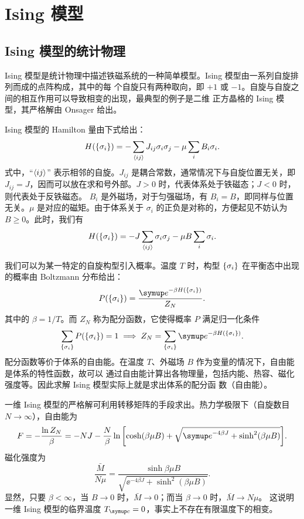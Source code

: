 \chapter{Ising 模型}

\section{Ising 模型的统计物理}
\label{sec:ising-physics}

Ising 模型是统计物理中描述铁磁系统的一种简单模型。Ising 模型由一系列自旋排列而成的点阵构成，其中的每
个自旋只有两种取向，即 $+1$ 或 $-1$。自旋与自旋之间的相互作用可以导致相变的出现，最典型的例子是二维
正方晶格的 Ising 模型，其严格解由 Onsager 给出。

Ising 模型的 Hamilton 量由下式给出：
\begin{equation}
  H({\{\sigma_i\}}) = -\sum_{\langle ij\rangle} J_{ij}\sigma_i\sigma_j - \mu \sum_{i} B_i\sigma_i.
\end{equation}
式中，“$\langle ij\rangle$” 表示相邻的自旋。$J_{ij}$ 是耦合常数，通常情况下与自旋位置无关，即
$J_{ij}=J$，因而可以放在求和号外部。$J>0$ 时，代表体系处于铁磁态；$J<0$ 时，则代表处于反铁磁态。
$B_i$ 是外磁场，对于匀强磁场，有 $B_i=B$，即同样与位置无关。$\mu$ 是对应的磁矩。由于体系关于
$\sigma_i$ 的正负是对称的，方便起见不妨认为 $B \geqslant 0$。此时，我们有
\begin{equation}
  H({\{\sigma_i\}}) = -J \sum_{\langle ij\rangle} \sigma_i\sigma_j - \mu B \sum_{i} \sigma_i.
\end{equation}

我们可以为某一特定的自旋构型引入概率。温度 $T$ 时，构型 ${\{\sigma_i\}}$ 在平衡态中出现的概率由
Boltzmann 分布给出：
\begin{equation}
  \label{eq:ising-probability}
  P(\q{\sigma_i}) = \frac{\ee^{-\beta H(\q{\sigma_i})}}{Z_N}.
\end{equation}
其中的 $\beta=1/T$。而 $Z_N$ 称为配分函数，它使得概率 $P$ 满足归一化条件
\begin{equation}
  \sum_\q{\sigma_i} P(\q{\sigma_i}) = 1
  \implies Z_N = \sum_\q{\sigma_i} \ee^{-\beta H(\q{\sigma_i})}.
\end{equation}
配分函数等价于体系的自由能。在温度 $T$、外磁场 $B$ 作为变量的情况下，自由能是体系的特性函数，故可以
通过自由能计算出各物理量，包括内能、热容、磁化强度等。因此求解 Ising 模型实际上就是求出体系的配分函
数（自由能）。

一维 Ising 模型的严格解可利用转移矩阵的手段求出。热力学极限下（自旋数目 $N\to\infty$），自由能为
\begin{equation}
  F = - \frac{\ln Z_N}{\beta}
    = - N J - \frac{N}{\beta}
              \ln\qty[\cosh(\beta\mu B) + \sqrt{\ee^{-4\beta J} + \sinh^2(\beta\mu B)}].
\end{equation}
磁化强度为
\begin{equation}
  \frac{\bar{M}}{N\mu} = \frac{\sinh{\beta\mu B}}{\sqrt{\ee^{-4\beta J} + \sinh^2(\beta\mu B)}}.
\end{equation}
显然，只要 $\beta<\infty$，当 $B\to 0$ 时，$\bar{M}\to 0$；而当 $\beta\to 0$ 时，$\bar{M}\to N\mu$。
这说明一维 Ising 模型的临界温度 $\Tc=0$，事实上不存在有限温度下的相变。

